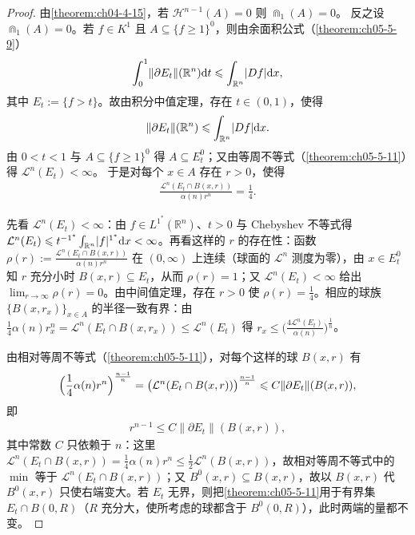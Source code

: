 ﻿\documentclass[../../main.tex]{subfiles}%
\begin{document}
\begin{proof}
由\cref{theorem:ch04-4-15}，若 $\mathcal{H}^{n-1}(A)=0$ 则 $\Cap_1(A)=0$。%
反之设 $\Cap_1(A)=0$。若 $f\in K^1$ 且 $A\subseteq\{f\geqslant1\}^0$，则由余面积公式（\cref{theorem:ch05-5-9}）%
\begin{align*}
\int_0^1\lVert\partial E_t\rVert(\mathbb{R}^n)\mathrm{d} t\leqslant\int_{\mathbb{R}^n}\lvert Df\rvert\mathrm{d} x,
\end{align*}
其中 $E_t:=\{f>t\}$。故由积分中值定理，存在 $t\in(0,1)$，使得
\begin{align*}
\lVert\partial E_t\rVert(\mathbb{R}^n)\leqslant\int_{\mathbb{R}^n}\lvert Df\rvert\mathrm{d} x .
\end{align*}
由 $0<t<1$ 与 $A\subseteq\{f\geqslant1\}^0$ 得 $A\subseteq E_t^0$；又由等周不等式（\cref{theorem:ch05-5-11}）得 $\mathcal{L}^n(E_t)<\infty$。%
于是对每个 $x\in A$ 存在 $r>0$，使得
\begin{align*}
\frac{\mathcal{L}^n(E_t\cap B(x,r))}{\alpha(n)r^n}=\frac14 .
\end{align*}

先看 $\mathcal{L}^n(E_t)<\infty$：由 $f\in L^{1^*}(\mathbb{R}^n)$、$t>0$ 与 Chebyshev 不等式得 $\mathcal{L}^n(E_t)\leqslant t^{-1^*}\int_{\mathbb{R}^n}\lvert f\rvert^{1^*}\mathrm{d} x<\infty$。再看这样的 $r$ 的存在性：函数 $\rho(r):=\frac{\mathcal{L}^n(E_t\cap B(x,r))}{\alpha(n)r^n}$ 在 $(0,\infty)$ 上连续（球面的 $\mathcal{L}^n$ 测度为零），由 $x\in E_t^0$ 知 $r$ 充分小时 $B(x,r)\subseteq E_t$，从而 $\rho(r)=1$；又 $\mathcal{L}^n(E_t)<\infty$ 给出 $\lim_{r\to\infty}\rho(r)=0$。由中间值定理，存在 $r>0$ 使 $\rho(r)=\frac14$。相应的球族 $\{B(x,r_x)\}_{x\in A}$ 的半径一致有界：由 $\frac14\alpha(n)r_x^n=\mathcal{L}^n(E_t\cap B(x,r_x))\leqslant\mathcal{L}^n(E_t)$ 得 $r_x\leqslant\bigl(\frac{4\mathcal{L}^n(E_t)}{\alpha(n)}\bigr)^{\frac1n}$。

由相对等周不等式（\cref{theorem:ch05-5-11}），对每个这样的球 $B(x,r)$ 有%
\begin{align*}
\Bigl(\frac14\alpha(n)r^n\Bigr)^{\frac{n-1}{n}}=\bigl(\mathcal{L}^n(E_t\cap B(x,r))\bigr)^{\frac{n-1}{n}}\leqslant C\lVert\partial E_t\rVert(B(x,r)),
\end{align*}
即
\begin{align*}
r^{n-1}\leqslant C\lVert\partial E_t\rVert(B(x,r)),
\end{align*}
其中常数 $C$ 只依赖于 $n$：这里 $\mathcal{L}^n(E_t\cap B(x,r))=\frac14\alpha(n)r^n\leqslant\frac12\mathcal{L}^n(B(x,r))$，故相对等周不等式中的 $\min$ 等于 $\mathcal{L}^n(E_t\cap B(x,r))$；又 $B^0(x,r)\subseteq B(x,r)$，故以 $B(x,r)$ 代 $B^0(x,r)$ 只使右端变大。若 $E_t$ 无界，则把\cref{theorem:ch05-5-11}用于有界集 $E_t\cap B(0,R)$（$R$ 充分大，使所考虑的球都含于 $B^0(0,R)$），此时两端的量都不变。%


\end{proof}
\end{document}
